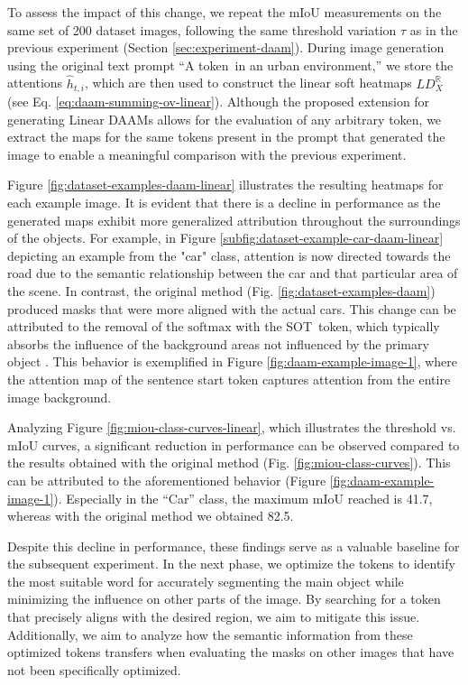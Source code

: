 To assess the impact of this change, we repeat the mIoU measurements on the same set of 200 dataset images, following the same threshold variation $\tau$ as in the previous experiment (Section \ref{sec:experiment-daam}). During image generation using the original text prompt ``A \textlangle token\textrangle\ in an urban environment,'' we store the attentions $\hat{h}_{t, i}$, which are then used to construct the linear soft heatmaps ${LD}^{\mathbb{R}}_X$ (see Eq. \ref{eq:daam-summing-ov-linear}). Although the proposed extension for generating Linear DAAMs allows for the evaluation of any arbitrary token, we extract the maps for the same tokens present in the prompt that generated the image to enable a meaningful comparison with the previous experiment.

Figure \ref{fig:dataset-examples-daam-linear} illustrates the resulting heatmaps for each example image. It is evident that there is a decline in performance as the generated maps exhibit more generalized attribution throughout the surroundings of the objects. For example, in Figure \ref{subfig:dataset-example-car-daam-linear} depicting an example from the "car" class, attention is now directed towards the road due to the semantic relationship between the car and that particular area of the scene. In contrast, the original method (Fig. \ref{fig:dataset-examples-daam}) produced masks that were more aligned with the actual cars. This change can be attributed to the removal of the $\text{softmax}$ with the \textlangle SOT\textrangle\ token, which typically absorbs the influence of the background areas not influenced by the primary object \cite{DAAM}. This behavior is exemplified in Figure \ref{fig:daam-example-image-1}, where the attention map of the sentence start token captures attention from the entire image background.

Analyzing Figure \ref{fig:miou-class-curves-linear}, which illustrates the threshold vs. mIoU curves, a significant reduction in performance can be observed compared to the results obtained with the original method (Fig. \ref{fig:miou-class-curves}). This can be attributed to the aforementioned behavior (Figure \ref{fig:daam-example-image-1}). Especially in the ``Car'' class, the maximum mIoU reached is 41.7, whereas with the original method we obtained 82.5.

Despite this decline in performance, these findings serve as a valuable baseline for the subsequent experiment. In the next phase, we optimize the tokens to identify the most suitable word for accurately segmenting the main object while minimizing the influence on other parts of the image. By searching for a token that precisely aligns with the desired region, we aim to mitigate this issue. Additionally, we aim to analyze how the semantic information from these optimized tokens transfers when evaluating the masks on other images that have not been specifically optimized.

